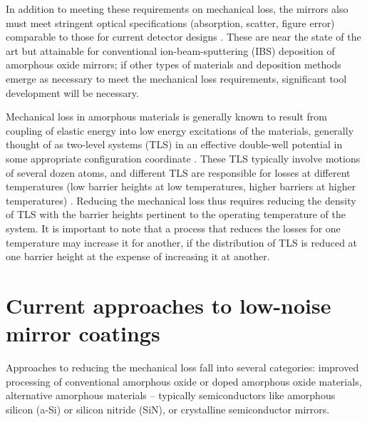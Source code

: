 In addition to meeting these requirements on mechanical loss, the mirrors also must meet stringent optical specifications (absorption, scatter, figure error) comparable to those for current detector designs \cite{AdvancedVirgo2015, AdvancedLIGO2015}. These are near the state of the art but attainable for conventional ion-beam-sputtering (IBS) deposition of amorphous oxide mirrors; if other types of materials and deposition methods emerge as necessary to meet the mechanical loss requirements, significant tool development will be necessary.

Mechanical loss in amorphous materials is generally known to result from coupling of elastic energy into low energy excitations of the materials, generally thought of as two-level systems (TLS) in an effective double-well potential in some appropriate configuration coordinate \cite{braginsky1985systems,bommel1956dislocations}. These TLS typically involve motions of several dozen atoms, and different TLS are responsible for losses at different temperatures (low barrier heights at low temperatures, higher barriers at higher temperatures) \cite{hamdan2014molecular,trinastic2016molecular}. Reducing the mechanical loss thus requires reducing the density of TLS with the barrier heights pertinent to the operating temperature of the system. It is important to note that a process that reduces the losses for one temperature may increase it for another, if the distribution of TLS is reduced at one barrier height at the expense of increasing it at another.

\section{Current approaches to low-noise mirror coatings}

Approaches to reducing the mechanical loss fall into several categories: improved processing of conventional amorphous oxide or doped amorphous oxide materials, alternative amorphous materials -- typically semiconductors like amorphous silicon (a-Si) or silicon nitride (SiN), or crystalline semiconductor mirrors.

